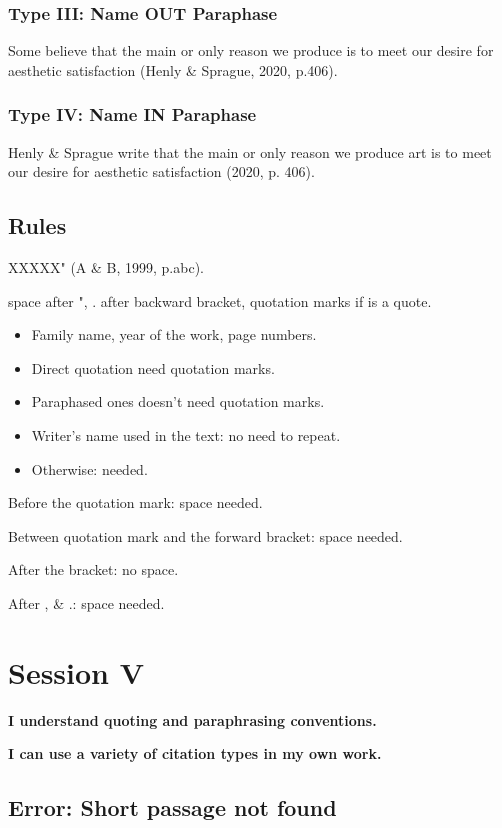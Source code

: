 \documentclass[a4paper]{article}
\begin{document}
\subsubsection{Type III: Name OUT Paraphase}

Some believe that the main or only reason we produce is to meet our desire for aesthetic satisfaction (Henly \& Sprague, 2020, p.406).

\subsubsection{Type IV: Name IN Paraphase}

Henly \& Sprague write that the main or only reason we produce art is to meet our desire for aesthetic satisfaction (2020, p. 406).

\subsection{Rules}

XXXXX" (A \& B, 1999, p.abc).

space after ", . after backward bracket, quotation marks if is a quote.

\begin{itemize}
    \item Family name, year of the work, page numbers.
    \item Direct quotation need quotation marks.
    \item Paraphased ones doesn't need quotation marks.
    \item Writer's name used in the text: no need to repeat.
    \item Otherwise: needed.
\end{itemize}

Before the quotation mark: space needed.

Between quotation mark and the forward bracket: space needed.

After the bracket: no space.

After , \& .: space needed. 

\section{Session V}

\textbf{I understand quoting and paraphrasing conventions.}

\textbf{I can use a variety of citation types in my own work.}

\subsection{Error: Short passage not found}
\end{document}
